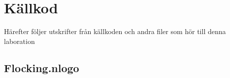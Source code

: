 \documentclass[titlepage, a4paper, 12pt]{article}
\begin{document}
\section{Källkod}\label{sec:kallkod}
Härefter följer utskrifter från källkoden och andra filer som hör till
denna laboration

\subsection{Flocking.nlogo}\label{app:Flocking.nlogo}
\begin{footnotesize}
  
\end{footnotesize}
\end{document}
